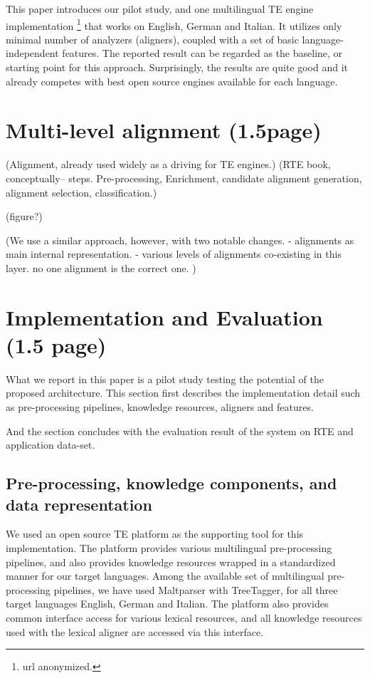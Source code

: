 \documentclass[11pt,letterpaper]{article}
\begin{document}
This paper introduces our pilot study, and one multilingual TE engine
implementation \footnote{url anonymized.} that works on English,
German and Italian. It utilizes only minimal number of analyzers
(aligners), coupled with a set of basic language-independent
features. The reported result can be regarded as the baseline, or
starting point for this approach. Surprisingly, the results are quite
good and it already competes with best open source engines available
for each language. 


\section{Multi-level alignment (1.5page)}

(Alignment, already used widely as a driving for TE engines.) 
(RTE book, conceptually-- steps. Pre-processing, Enrichment, candidate
alignment generation, alignment selection, classification.) 

(figure?)

(We use a similar approach, however, with two notable changes.
- alignments as main internal representation. 
- various levels of alignments co-existing in this layer. no one
alignment is the correct one. 
)


\section{Implementation and Evaluation (1.5 page)}
What we report in this paper is a pilot study testing the potential of
the proposed architecture. This section first describes the
implementation detail such as pre-processing pipelines, knowledge
resources, aligners and features. 

And the section concludes with the evaluation result of the system on
RTE and application data-set.   

\subsection{Pre-processing, knowledge components, and data representation} 
We used an open source TE platform \cite{EOP-demo} as the supporting
tool for this implementation. The platform provides various
multilingual pre-processing pipelines, and also provides knowledge  
resources wrapped in a standardized manner for our target languages.
Among the available set of multilingual pre-processing pipelines, we
have used Maltparser with TreeTagger, for all three target languages
English, German and Italian. The platform also provides common
interface access for various lexical resources, and all knowledge
resources used with the lexical aligner are accessed via this
interface. 
\end{document}
